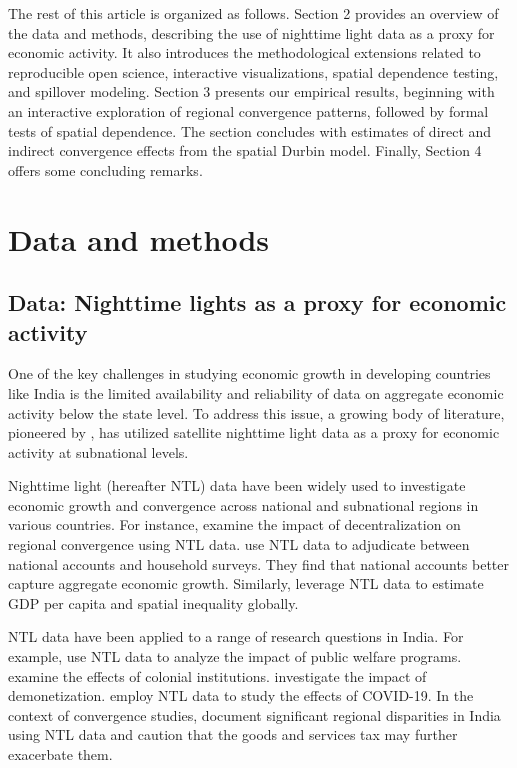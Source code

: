 \documentclass[
  a4paper, 
  twoside,
  review
]{article}
\begin{document}
The rest of this article is organized as follows. Section 2 provides an
overview of the data and methods, describing the use of nighttime light
data as a proxy for economic activity. It also introduces the
methodological extensions related to reproducible open science,
interactive visualizations, spatial dependence testing, and spillover
modeling. Section 3 presents our empirical results, beginning with an
interactive exploration of regional convergence patterns, followed by
formal tests of spatial dependence. The section concludes with estimates
of direct and indirect convergence effects from the spatial Durbin
model. Finally, Section 4 offers some concluding remarks.

\section{Data and methods}\label{data-and-methods}

\subsection{Data: Nighttime lights as a proxy for economic
activity}\label{data-nighttime-lights-as-a-proxy-for-economic-activity}

One of the key challenges in studying economic growth in developing
countries like India is the limited availability and reliability of data
on aggregate economic activity below the state level. To address this
issue, a growing body of literature, pioneered by
\citet{henderson_storeygard_weil_lights}, has utilized satellite
nighttime light data as a proxy for economic activity at subnational
levels.

Nighttime light (hereafter NTL) data have been widely used to
investigate economic growth and convergence across national and
subnational regions in various countries. For instance,
\citet{adhikari_dhital_decentralization} examine the impact of
decentralization on regional convergence using NTL data.
\citet{pinkovskiy_salaimartin_lights_poverty} use NTL data to adjudicate
between national accounts and household surveys. They find that national
accounts better capture aggregate economic growth. Similarly,
\citet{lessmann_seidel_regional_inequality} leverage NTL data to
estimate GDP per capita and spatial inequality globally.

NTL data have been applied to a range of research questions in India.
For example, \citet{cook_shah_nregs} use NTL data to analyze the impact
of public welfare programs. \citet{jha_talathi_colonial_india} examine
the effects of colonial institutions. \citet{chanda_cook_demonetization}
investigate the impact of demonetization. \citet{beyer_jain_sinha_covid}
employ NTL data to study the effects of COVID-19. In the context of
convergence studies, \citet{chakravarty_dehejia_gst} document
significant regional disparities in India using NTL data and caution
that the goods and services tax may further exacerbate them.
\end{document}
